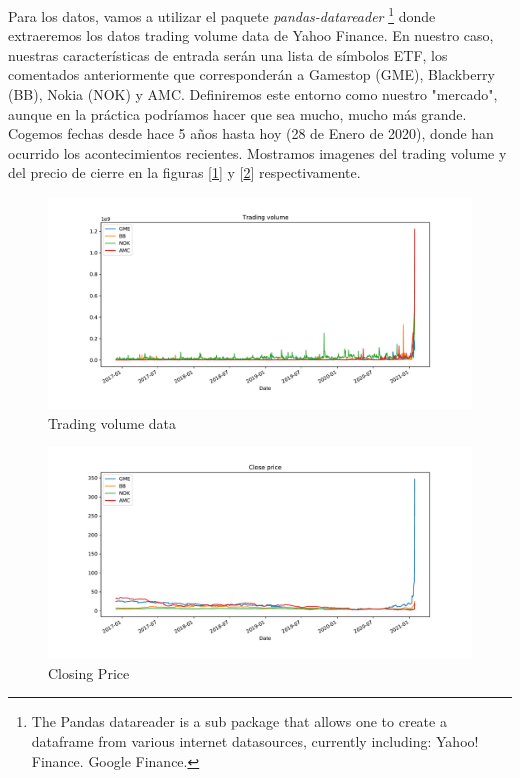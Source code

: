 \documentclass[12pt,twoside]{report}
\begin{document}
Para los datos, vamos a utilizar el paquete \textit{pandas-datareader} \cite{pandas-datareader} \footnote{The Pandas datareader is a sub package that allows one to create a dataframe from various internet datasources, currently including: Yahoo! Finance. Google Finance.} donde extraeremos los datos trading volume data de Yahoo Finance. En nuestro caso, nuestras características de entrada serán una lista de símbolos ETF, los comentados anteriormente que corresponderán a Gamestop (GME), Blackberry (BB), Nokia (NOK) y AMC. Definiremos este entorno como nuestro "mercado", aunque en la práctica podríamos hacer que sea mucho, mucho más grande. Cogemos fechas desde hace 5 años hasta hoy (28 de Enero de 2020), donde han ocurrido los acontecimientos recientes. Mostramos imagenes del trading volume y del precio de cierre en la figuras [\ref{fig:trading-volume}] y [\ref{fig:closing-price}] respectivamente.

\begin{figure}[H]
\includegraphics[width=\textwidth]{../code/figures/trading_volume.pdf}
\centering
\caption{Trading volume data}
\label{fig:trading-volume}
\end{figure}

\begin{figure}[H]
\includegraphics[width=\textwidth]{../code/figures/close_price.pdf}
\centering
\caption{Closing Price}
\label{fig:closing-price}
\end{figure}
\end{document}
